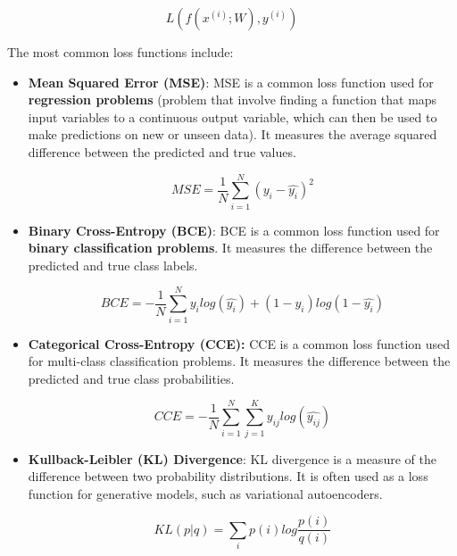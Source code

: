 \documentclass{article}
\begin{document}
\begin{equation*}
    L(f(x^{(i)};W), y^{(i)})
\end{equation*}

The most common loss functions include:
\begin{itemize}
    \item \textbf{Mean Squared Error (MSE)}: MSE is a common loss function used for \textbf{regression problems} (problem that involve finding a function that maps input variables to a continuous output variable, which can then be used to make predictions on new or unseen data). It measures the average squared difference between the predicted and true values.

    \begin{equation*}
        MSE = \frac{1}{N} \sum_{i=1}^{N}(y_i - \hat{y_i})^2
    \end{equation*}

    \item \textbf{Binary Cross-Entropy (BCE)}: BCE is a common loss function used for \textbf{binary classification problems}. It measures the difference between the predicted and true class labels.

    \begin{equation*}
        BCE = -\frac{1}{N} \sum_{i=1}^{N} y_i log(\hat{y_i}) + (1-y_i)log(1-\hat{y_i})
    \end{equation*}

    \item \textbf{Categorical Cross-Entropy (CCE):} CCE is a common loss function used for multi-class classification problems. It measures the difference between the predicted and true class probabilities.

    \begin{equation*}
        CCE = -\frac{1}{N} \sum_{i=1}^{N}\sum_{j=1}^{K}y_{ij} log(\hat{y_{ij}})
    \end{equation*}

    \item \textbf{Kullback-Leibler (KL) Divergence}: KL divergence is a measure of the difference between two probability distributions. It is often used as a loss function for generative models, such as variational autoencoders.

    \begin{equation*}
        KL(p|q) = \sum_{i}p(i)log\frac{p(i)}{q(i)}
    \end{equation*}
    
\end{itemize}
\end{document}
